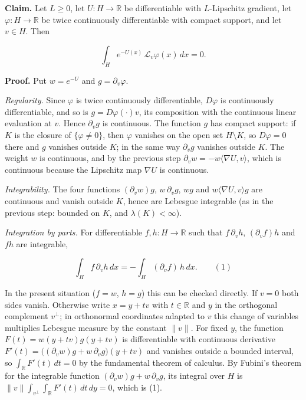 \documentclass[11pt,a4paper]{article}
\begin{document}
\textbf{Claim.} Let \(L\ge0\), let \(U:H\to\mathbb R\) be differentiable with \(L\)-Lipschitz gradient, let \(\varphi:H\to\mathbb R\) be twice continuously differentiable with compact support, and let \(v\in H\). Then


\[\int_He^{-U(x)}\,\mathcal L_v\varphi(x)\,dx=0.\]


\textbf{Proof.} Put \(w=e^{-U}\) and \(g=\partial_v\varphi\).




\emph{Regularity.} Since \(\varphi\) is twice continuously differentiable, \(D\varphi\) is continuously differentiable, and so is \(g=D\varphi(\cdot)v\), its composition with the continuous linear evaluation at \(v\). Hence \(\partial_vg\) is continuous. The function \(g\) has compact support: if \(K\) is the closure of \(\{\varphi\ne0\}\), then \(\varphi\) vanishes on the open set \(H\setminus K\), so \(D\varphi=0\) there and \(g\) vanishes outside \(K\); in the same way \(\partial_vg\) vanishes outside \(K\). The weight \(w\) is continuous, and by the previous step \(\partial_vw=-w\langle\nabla U,v\rangle\), which is continuous because the Lipschitz map \(\nabla U\) is continuous.




\emph{Integrability.} The four functions \((\partial_vw)g\), \(w\,\partial_vg\), \(wg\) and \(w\langle\nabla U,v\rangle g\) are continuous and vanish outside \(K\), hence are Lebesgue integrable (as in the previous step: bounded on \(K\), and \(\lambda(K)<\infty\)).




\emph{Integration by parts.} For differentiable \(f,h:H\to\mathbb R\) such that \(f\,\partial_vh\), \((\partial_vf)h\) and \(fh\) are integrable,


\[\int_Hf\,\partial_vh\,dx=-\int_H(\partial_vf)\,h\,dx.\qquad(1)\]


In the present situation (\(f=w\), \(h=g\)) this can be checked directly. If \(v=0\) both sides vanish. Otherwise write \(x=y+tv\) with \(t\in\mathbb R\) and \(y\) in the orthogonal complement \(v^\perp\); in orthonormal coordinates adapted to \(v\) this change of variables multiplies Lebesgue measure by the constant \(\|v\|\). For fixed \(y\), the function \(F(t)=w(y+tv)g(y+tv)\) is differentiable with continuous derivative \(F'(t)=\bigl((\partial_vw)g+w\,\partial_vg\bigr)(y+tv)\) and vanishes outside a bounded interval, so \(\int_{\mathbb R}F'(t)\,dt=0\) by the fundamental theorem of calculus. By Fubini's theorem for the integrable function \((\partial_vw)g+w\,\partial_vg\), its integral over \(H\) is \(\|v\|\int_{v^\perp}\int_{\mathbb R}F'(t)\,dt\,dy=0\), which is (1).
\end{document}
